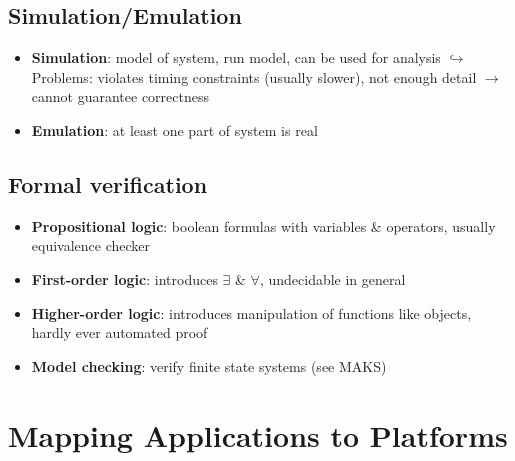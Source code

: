 \documentclass{article}
\begin{document}
\subsection{Simulation/Emulation}
\begin{itemize}
  \item \textbf{Simulation}: model of system, run model, can be used for analysis
        $\hookrightarrow$ Problems: violates timing constraints (usually slower), not enough detail $\to$ cannot guarantee correctness
  \item \textbf{Emulation}: at least one part of system is real
\end{itemize}

\subsection{Formal verification}
\begin{itemize}
  \item \textbf{Propositional logic}: boolean formulas with variables \& operators, usually equivalence checker
  \item \textbf{First-order logic}: introduces $\exists$ \& $\forall$, undecidable in general
  \item \textbf{Higher-order logic}: introduces manipulation of functions like objects, hardly ever automated proof
  \item \textbf{Model checking}: verify finite state systems (see MAKS)
\end{itemize}



\section{Mapping Applications to Platforms}
\end{document}
